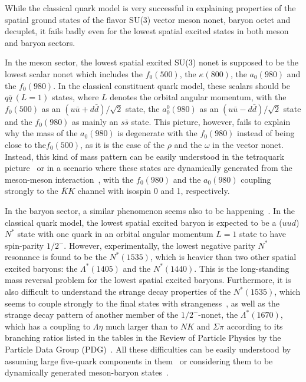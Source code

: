 While the classical quark model is very successful in explaining properties of
the spatial ground states of the flavor SU(3) vector meson nonet, baryon octet
and decuplet, it fails badly even for the lowest spatial excited states in both
meson and baryon sectors.

In the meson sector, the lowest spatial excited SU(3) nonet is supposed to be
the lowest scalar nonet which includes the $f_0(500)$, the $\kappa(800)$, the
$a_0(980)$ and the $f_0(980)$. In the classical constituent quark model, these
scalars should be $q\bar q~(L=1)$ states, where $L$ denotes the orbital angular
momentum, with the $f_0(500)$ as an  $(u\bar u+d\bar d)/\sqrt{2}$ state, the
$a_0^0(980)$ as an $(u\bar u-d\bar d)/\sqrt{2}$ state and the $f_0(980)$ as
mainly an $s\bar s$ state. This picture, however, fails to explain why the mass
of the $a_0(980)$ is degenerate with the $f_0(980)$ instead of being close to
the$f_0(500)$,
 as it is the case of the $\rho$ and the $\omega$ in the vector nonet. Instead,
this kind of mass pattern can be easily understood in the tetraquark
picture~\cite{Jaffe:1976ig} or in a scenario where these states are dynamically
generated from the meson-meson
interaction~\cite{Weinstein:1982gc,Janssen:1994wn,Oller:2000ma}, with the
$f_0(980)$ and the $a_0(980)$ coupling strongly to the $\bar KK$ channel with
isospin 0 and 1, respectively.

In the baryon sector, a similar phenomenon seems also to be
happening~\cite{Zou:2007mk}.
In the classical quark model, the lowest spatial excited baryon is expected to
be a ($uud$) $N^*$ state with one quark in an orbital angular momentum $L=1$
state to have spin-parity $1/2^-$.
However, experimentally, the lowest negative parity $N^*$ resonance is found to
be the $N^*(1535)$, which is heavier than two other spatial excited baryons:
the $\Lambda^*(1405)$ and the $N^*(1440)$. This is the long-standing mass
reversal problem for the lowest spatial excited baryons. Furthermore, it is also
difficult to understand the strange decay properties of the $N^*(1535)$, which
seems to couple strongly to the final states with strangeness~\cite{Liu:2005pm},
as well as the strange decay pattern of another member of the $1/2^-$-nonet, the
$\Lambda^*(1670)$, which has a coupling to $\Lambda\eta$ much larger than to
$NK$ and $\Sigma\pi$ according to its branching ratios listed in the tables in
the Review of Particle Physics by the Particle Data Group
(PDG)~\cite{Olive:2016xmw}.
All these difficulties can be easily understood by assuming large five-quark
components in them~\cite{Zou:2007mk,Liu:2005pm,Helminen:2000jb} or considering
them to be dynamically generated  meson-baryon
states~\cite{Oller:2000ma,Kaiser:1995eg,Oset:1997it,Oller:2000fj,Inoue:2001ip,
GarciaRecio:2003ks,Hyodo:2002pk,Magas:2005vu,Huang:2007zza,Bruns:2010sv}.

